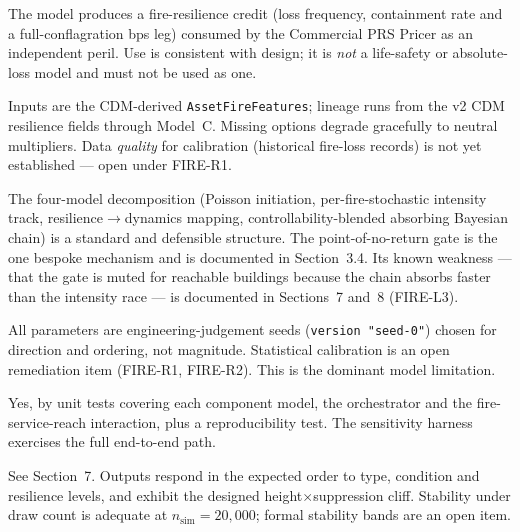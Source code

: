 \documentclass[11pt,a4paper]{article}
\begin{document}
\mkmgovernance

The model produces a fire-resilience credit (loss frequency, containment rate
and a full-conflagration bps leg) consumed by the Commercial PRS Pricer as an
independent peril. Use is consistent with design; it is \emph{not} a life-safety
or absolute-loss model and must not be used as one.

Inputs are the CDM-derived \texttt{AssetFireFeatures}; lineage runs from the
v2 CDM resilience fields through Model~C. Missing options degrade gracefully to
neutral multipliers. Data \emph{quality} for calibration (historical fire-loss
records) is not yet established --- open under FIRE-R1.

The four-model decomposition (Poisson initiation, per-fire-stochastic intensity
track, resilience$\rightarrow$dynamics mapping, controllability-blended absorbing
Bayesian chain) is a standard and defensible structure. The point-of-no-return
gate is the one bespoke mechanism and is documented in Section~3.4. Its known
weakness --- that the gate is muted for reachable buildings because the chain
absorbs faster than the intensity race --- is documented in Sections~7 and~8
(FIRE-L3).

All parameters are engineering-judgement seeds (\texttt{version "seed-0"}) chosen
for direction and ordering, not magnitude. Statistical calibration is an open
remediation item (FIRE-R1, FIRE-R2). This is the dominant model limitation.

Yes, by unit tests covering each component model, the orchestrator and the
fire-service-reach interaction, plus a reproducibility test. The sensitivity
harness exercises the full end-to-end path.

See Section~7. Outputs respond in the expected order to type, condition and
resilience levels, and exhibit the designed height$\times$suppression cliff.
Stability under draw count is adequate at $n_{\text{sim}}=20{,}000$;
formal stability bands are an open item.
\end{document}
